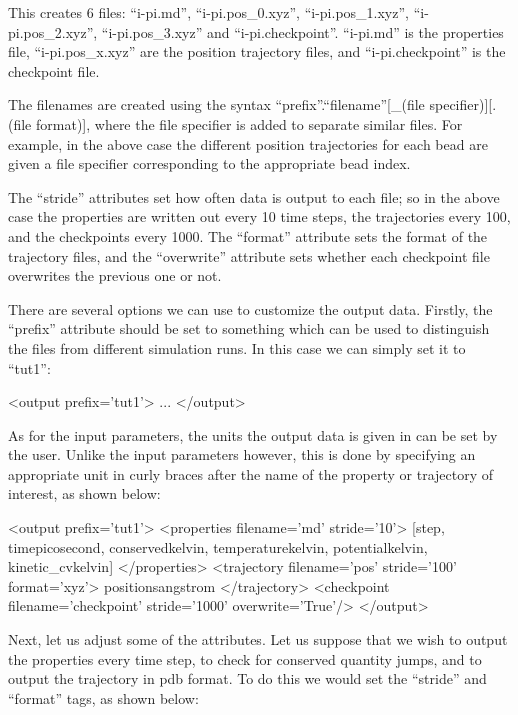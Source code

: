 \documentclass[11pt,english,fleqn]{report}
\newenvironment{code}{%
\footnotesize 
\verbatim
}{
\endverbatim
\normalsize
}
\begin{document}
This creates 6 files: {}``i-pi.md'', {}``i-pi.pos\_0.xyz'',
{}``i-pi.pos\_1.xyz'', {}``i-pi.pos\_2.xyz'', {}``i-pi.pos\_3.xyz''
and {}``i-pi.checkpoint''. 
{}``i-pi.md'' is the properties file, {}``i-pi.pos\_x.xyz'' are the
position trajectory files, and {}``i-pi.checkpoint'' is the
checkpoint file.

The filenames are created using the syntax 
{}``prefix''.{}``filename''[\_(file specifier)][.(file format)], where the file specifier is
added to separate similar files. For example, in the above case the 
different position trajectories for each bead are given a file specifier
corresponding to the appropriate bead index.

The {}``stride'' attributes set how often data is output to each file;
so in the above case the properties are written out every 10 time steps,
the trajectories every 100, and the checkpoints every 1000.
The {}``format'' attribute sets the format of the trajectory files,
and the {}``overwrite'' attribute sets whether each checkpoint file 
overwrites the previous one or not.

There are several options we can use to customize the
output data. Firstly, the {}``prefix'' attribute should be set to
something which can be used to distinguish the files from different
simulation runs. In this case we can simply set it to {}``tut1'':

\begin{code}
<output prefix='tut1'>
   ...
</output>
\end{code}

As for the input parameters, the units the output data is given in can be
set by the user. Unlike the input parameters however, 
this is done by specifying an
appropriate unit in curly braces after the name of the 
property or trajectory of interest, as shown below:

\begin{code}
<output prefix='tut1'>
   <properties filename='md' stride='10'>
      [step, time{picosecond}, conserved{kelvin}, 
       temperature{kelvin}, potential{kelvin}, kinetic_cv{kelvin}] 
   </properties>
   <trajectory filename='pos' stride='100' format='xyz'>
      positions{angstrom} 
   </trajectory>
   <checkpoint filename='checkpoint' stride='1000' overwrite='True'/>
</output>
\end{code}

Next, let us adjust some of the attributes. Let us suppose that we
wish to output the properties every time step, to check for conserved
quantity jumps, and to output the trajectory in pdb format.
To do this we would set the {}``stride'' and {}``format'' tags,
as shown below:
\end{document}
